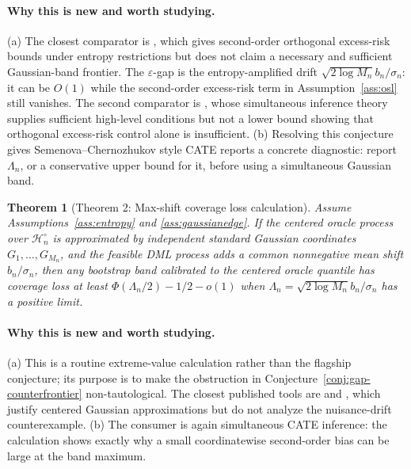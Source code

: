 \documentclass[11pt]{article}
\newcommand{\calH}{\mathcal{H}}
\theoremstyle{definition}
\theoremstyle{plain}
\newtheorem{theorem}{Theorem}
\theoremstyle{remark}
\begin{document}
\paragraph{Why this is new and worth studying.}
(a) The closest comparator is \citet[\S3]{FosterSyrgkanis2023OSL}, which gives
second-order orthogonal excess-risk bounds under entropy restrictions but does
not claim a necessary and sufficient Gaussian-band frontier.  The
\(\varepsilon\)-gap is the entropy-amplified drift
\(\sqrt{2\log M_n}b_n/\sigma_n\): it can be \(O(1)\) while the second-order
excess-risk term in Assumption~\ref{ass:osl} still vanishes.  The second
comparator is \citet[\S3]{SemenovaChernozhukov2021DMLCATE}, whose simultaneous
inference theory supplies sufficient high-level conditions but not a lower
bound showing that orthogonal excess-risk control alone is insufficient.  (b)
Resolving this conjecture gives Semenova--Chernozhukov style CATE reports a
concrete diagnostic: report \(\Lambda_n\), or a conservative upper bound for it,
before using a simultaneous Gaussian band.

\begin{theorem}[Theorem 2: Max-shift coverage loss calculation]\label{thm:maxshift}
Assume Assumptions~\ref{ass:entropy} and \ref{ass:gaussianedge}.  If the
centered oracle process over \(\calH_n^\circ\) is approximated by independent
standard Gaussian coordinates \(G_1,\ldots,G_{M_n}\), and the feasible DML
process adds a common nonnegative mean shift \(b_n/\sigma_n\), then any
bootstrap band calibrated to the centered oracle quantile has coverage loss at
least \(\Phi(\Lambda_n/2)-1/2-o(1)\) when
\(\Lambda_n=\sqrt{2\log M_n}b_n/\sigma_n\) has a positive limit.
\end{theorem}

\paragraph{Why this is new and worth studying.}
(a) This is a routine extreme-value calculation rather than the flagship
conjecture; its purpose is to make the obstruction in
Conjecture~\ref{conj:gap-counterfrontier} non-tautological.  The closest
published tools are \citet{ChernozhukovChetverikovKato2017HDCLT} and
\citet{ChernozhukovChetverikovKato2017EmpiricalBootstrap}, which justify
centered Gaussian approximations but do not analyze the nuisance-drift
counterexample.  (b) The consumer is again simultaneous CATE inference: the
calculation shows exactly why a small coordinatewise second-order bias can be
large at the band maximum.
\end{document}
